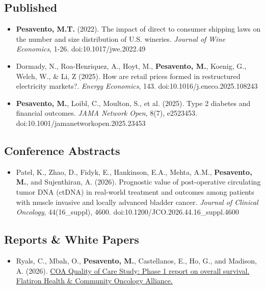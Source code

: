 \subsection{Published}
\begin{itemize}
    \itemsep0.5em
    \item \textbf{Pesavento, M.T.} (2022). The impact of direct to consumer shipping laws on the number and size distribution of U.S. wineries. \textit{Journal of Wine Economics}, 1-26. doi:10.1017/jwe.2022.49
    \item Dormady, N., Roa-Henriquez, A., Hoyt, M., \textbf{Pesavento, M.}, Koenig, G., Welch, W., \& Li, Z (2025). How are retail prices formed in restructured electricity markets?. \textit{Energy Economics}, 143. doi:10.1016/j.eneco.2025.108243
    \item \textbf{Pesavento, M.}, Loibl, C., Moulton, S., et al. (2025). Type 2 diabetes and financial outcomes. \textit{JAMA Network Open}, 8(7), e2523453. doi:10.1001/jamanetworkopen.2025.23453
\end{itemize}

\subsection{Conference Abstracts}
\begin{itemize}
    \itemsep0.5em
    \item Patel, K., Zhao, D., Fidyk, E., Hankinson, E.A., Mehta, A.M., \textbf{Pesavento, M.}, and Sujenthiran, A. (2026). Prognostic value of post-operative circulating tumor DNA (ctDNA) in real-world treatment and outcomes among patients with muscle invasive and locally advanced bladder cancer. \textit{Journal of Clinical Oncology}, 44(16\_suppl), 4600. doi:10.1200/JCO.2026.44.16\_suppl.4600
\end{itemize}

\subsection{Reports \& White Papers}
\begin{itemize}
    \itemsep0.5em
    \item Ryals, C., Mbah, O., \textbf{Pesavento, M.}, Castellanos, E., Ho, G., and Madison, A. (2026). \href{https://mycoa.communityoncology.org/publications/studies-and-reports/quality-of-care}{COA Quality of Care Study: Phase 1 report on overall survival. Flatiron Health \& Community Oncology Alliance.}
\end{itemize}


